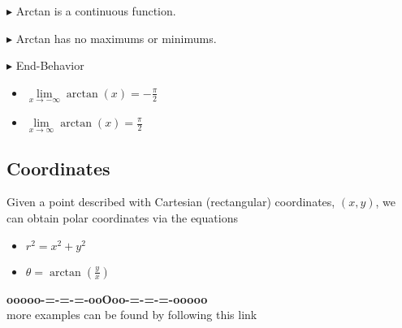 \documentclass{ximera}
\begin{document}
$\blacktriangleright$ Arctan is a continuous function.

$\blacktriangleright$ Arctan has no maximums or minimums.


$\blacktriangleright$ End-Behavior





\begin{itemize}
  \item $\lim\limits_{x \to -\infty} \arctan(x) = -\frac{\pi}{2}$
  \item $\lim\limits_{x \to \infty} \arctan(x) = \frac{\pi}{2}$
\end{itemize}










\subsection*{Coordinates} 

Given a point described with Cartesian (rectangular) coordinates, $(x, y)$, we can obtain polar coordinates via the equations


\begin{itemize}
\item $r^2 = x^2 + y^2$
\item $\theta = \arctan\left( \frac{y}{x} \right)$
\end{itemize}












\begin{center}
\textbf{\textcolor{green!50!black}{ooooo-=-=-=-ooOoo-=-=-=-ooooo}} \\

more examples can be found by following this link\\ 

\end{center}
\end{document}
